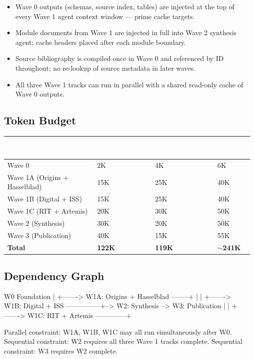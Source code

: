 \documentclass[11pt,letterpaper]{article}
\newcommand{\tableheader}[1]{\textbf{\sffamily\textcolor{white}{#1}}}
\begin{document}
\begin{itemize}[leftmargin=1.5em]
  \item Wave 0 outputs (schemas, source index, tables) are injected at the top of every Wave 1 agent context window --- prime cache targets.
  \item Module documents from Wave 1 are injected in full into Wave 2 synthesis agent; cache headers placed after each module boundary.
  \item Source bibliography is compiled once in Wave 0 and referenced by ID throughout; no re-lookup of source metadata in later waves.
  \item All three Wave 1 tracks can run in parallel with a shared read-only cache of Wave 0 outputs.
\end{itemize}

\subsection{Token Budget}

\begin{center}
\begin{tabularx}{\textwidth}{XC{2.5cm}C{2.5cm}C{2.5cm}}
\toprule
{}
\tableheader{Wave} & \tableheader{Estimated Input} & \tableheader{Estimated Output} & \tableheader{Subtotal} \\
\midrule
Wave 0 & 2K & 4K & 6K \\
Wave 1A (Origins + Hasselblad) & 15K & 25K & 40K \\
Wave 1B (Digital + ISS) & 15K & 25K & 40K \\
Wave 1C (RIT + Artemis) & 20K & 30K & 50K \\
Wave 2 (Synthesis) & 30K & 20K & 50K \\
Wave 3 (Publication) & 40K & 15K & 55K \\
\midrule
\textbf{Total} & \textbf{122K} & \textbf{119K} & \textbf{$\sim$241K} \\
\bottomrule
\end{tabularx}
\end{center}

\subsection{Dependency Graph}

\begin{asciibox}
W0 Foundation
 |
 +-------> W1A: Origins + Hasselblad  --------+
 |                                             |
 +-------> W1B: Digital + ISS  ---------------+--> W2: Synthesis --> W3: Publication
 |                                             |
 +-------> W1C: RIT + Artemis  --------------+

Parallel constraint: W1A, W1B, W1C may all run simultaneously after W0.
Sequential constraint: W2 requires all three Wave 1 tracks complete.
Sequential constraint: W3 requires W2 complete.
\end{asciibox}
\end{document}
